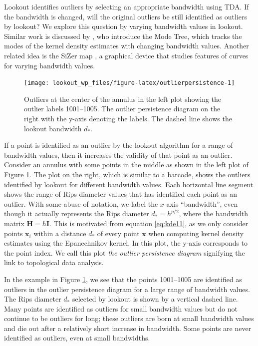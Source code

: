 \documentclass[11pt,a4paper,]{article}
\theoremstyle{definition}
\theoremstyle{definition}
\theoremstyle{definition}
\theoremstyle{remark}
\begin{document}
Lookout identifies outliers by selecting an appropriate bandwidth using TDA. If the bandwidth is changed, will the original outliers be still identified as outliers by lookout? We explore this question by varying bandwidth values in lookout. Similar work is discussed by \textcite{Minnotte1993}, who introduce the Mode Tree, which tracks the modes of the kernel density estimates with changing bandwidth values. Another related idea is the SiZer map \autocite{Chaudhuri1999}, a graphical device that studies features of curves for varying bandwidth values.

\begin{figure}
\texttt{[image: lookout\_wp\_files/figure-latex/outlierpersistence-1]} \caption{Outliers at the center of the annulus in the left plot showing the outlier labels 1001--1005. The outlier persistence diagram on the right with the y-axis denoting the labels. The dashed line shows the lookout bandwidth $d_*$.}\label{fig:outlierpersistence}
\end{figure}

If a point is identified as an outlier by the lookout algorithm for a range of bandwidth values, then it increases the validity of that point as an outlier. Consider an annulus with some points in the middle as shown in the left plot of Figure \ref{fig:outlierpersistence}. The plot on the right, which is similar to a barcode, shows the outliers identified by lookout for different bandwidth values. Each horizontal line segment shows the range of Rips diameter values that has identified each point as an outlier. With some abuse of notation, we label the \(x\) axis ``bandwidth'', even though it actually represents the Rips diameter \(d_* = h^{p/2}\), where the bandwidth matrix \(\bm{H} = h\bm{I}\). This is motivated from equation \eqref{eq:kde11}, as we only consider points \(\bm{x}_i\) within a distance \(d_*\) of every point \(\bm{x}\) when computing kernel density estimates using the Epanechnikov kernel. In this plot, the y-axis corresponds to the point index. We call this plot \emph{the outlier persistence diagram} signifying the link to topological data analysis.

In the example in Figure \ref{fig:outlierpersistence}, we see that the points 1001--1005 are identified as outliers in the outlier persistence diagram for a large range of bandwidth values. The Rips diameter \(d_*\) selected by lookout is shown by a vertical dashed line. Many points are identified as outliers for small bandwidth values but do not continue to be outliers for long; these outliers are born at small bandwidth values and die out after a relatively short increase in bandwidth. Some points are never identified as outliers, even at small bandwidths.
\end{document}
